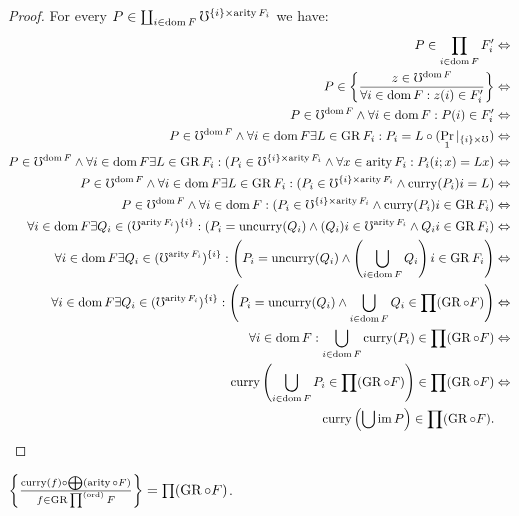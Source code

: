 \begin{proof}
For every $P\in\coprod_{i\in\operatorname{dom} F}\mho^{\{i\}\times\operatorname{arity} F_{i}}$
we have:
\begin{align*}
P\in\prod_{i\in\operatorname{dom} F}F'_{i} & \Leftrightarrow\\
P\in\left\{ \frac{z\in\mho^{\operatorname{dom} F}}{\forall i\in\operatorname{dom} F:z(i)\in F'_{i}}\right\} & \Leftrightarrow\\
P\in\mho^{\operatorname{dom} F}\land\forall i\in\operatorname{dom} F:P(i)\in F'_{i} & \Leftrightarrow\\
P\in\mho^{\operatorname{dom} F}\land\forall i\in\operatorname{dom} F\exists L\in\operatorname{GR} F_{i}:P_{i}=L\circ(\Pr_{1}|_{\{i\}\times\mho}) & \Leftrightarrow\\
P\in\mho^{\operatorname{dom} F}\land\forall i\in\operatorname{dom} F\exists L\in\operatorname{GR} F_{i}:(P_{i}\in\mho^{\{i\}\times\operatorname{arity} F_{i}}\land\forall x\in\operatorname{arity} F_{i}:P_{i}(i;x)=Lx) & \Leftrightarrow\\
P\in\mho^{\operatorname{dom} F}\land\forall i\in\operatorname{dom} F\exists L\in\operatorname{GR} F_{i}:(P_{i}\in\mho^{\{i\}\times\operatorname{arity} F_{i}}\land\operatorname{curry}(P_{i})i=L) & \Leftrightarrow\\
P\in\mho^{\operatorname{dom} F}\land\forall i\in\operatorname{dom} F:(P_{i}\in\mho^{\{i\}\times\operatorname{arity} F_{i}}\land\operatorname{curry}(P_{i})i\in\operatorname{GR} F_{i}) & \Leftrightarrow\\
\forall i\in\operatorname{dom} F\exists Q_{i}\in(\mho^{\operatorname{arity} F_{i}})^{\{i\}}:(P_{i}=\operatorname{uncurry}(Q_{i})\land(Q_{i})i\in\mho^{\operatorname{arity} F_{i}}\land Q_{i}i\in\operatorname{GR} F_{i}) & \Leftrightarrow\\
\forall i\in\operatorname{dom} F\exists Q_{i}\in(\mho^{\operatorname{arity} F_{i}})^{\{i\}}:\left(P_{i}=\operatorname{uncurry}(Q_{i})\land\left(\bigcup_{i\in\operatorname{dom} F}Q_{i}\right)i\in\operatorname{GR} F_{i}\right) & \Leftrightarrow\\
\forall i\in\operatorname{dom} F\exists Q_{i}\in(\mho^{\operatorname{arity} F_{i}})^{\{i\}}:\left(P_{i}=\operatorname{uncurry}(Q_{i})\land\bigcup_{i\in\operatorname{dom} F}Q_{i}\in\prod(\operatorname{GR}\circ F)\right) & \Leftrightarrow\\
\forall i\in\operatorname{dom} F:\bigcup_{i\in\operatorname{dom} F}\operatorname{curry}(P_{i})\in\prod(\operatorname{GR}\circ F) & \Leftrightarrow\\
\operatorname{curry}\left(\bigcup_{i\in\operatorname{dom} F}P_{i}\in\prod(\operatorname{GR}\circ F)\right)\in\prod(\operatorname{GR}\circ F) & \Leftrightarrow\\
\operatorname{curry}\left(\bigcup\operatorname{im} P\right)\in\prod(\operatorname{GR}\circ F).
\end{align*}
\end{proof}
\begin{lem}
$\left\{ \frac{\operatorname{curry}(f)\circ\bigoplus(\operatorname{arity}\circ F)}{f\in\operatorname{GR}\prod^{\mathrm{(ord)}}F}\right\}=\prod(\operatorname{GR}\circ F)$.\end{lem}
